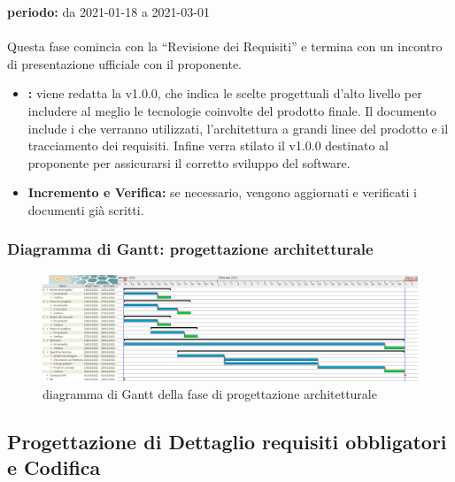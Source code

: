 	\textbf{periodo:} da 2021-01-18 a 2021-03-01 
	\\
	\\
	Questa fase comincia con la “Revisione dei Requisiti” e termina con un incontro di presentazione ufficiale con il proponente.
	\begin{itemize}
		\item \textbf{:} viene redatta la  v1.0.0, che indica le scelte progettuali d’alto livello per includere al meglio le tecnologie coinvolte del prodotto finale. Il documento include i  che verranno utilizzati, l’architettura a grandi linee del prodotto e il tracciamento dei requisiti. Infine verra stilato il  v1.0.0 destinato al proponente per assicurarsi il corretto sviluppo del software.
		\item \textbf{Incremento e Verifica:} se necessario, vengono aggiornati e verificati i documenti già scritti.
	\end{itemize}  

	\subsubsection{Diagramma di Gantt: progettazione architetturale}

		\begin{figure}[H]
			\centering
			\includegraphics[width=1\linewidth]{./res/images/Architetturale.png}
			\caption{diagramma di Gantt della fase di progettazione architetturale}
			\label{fig:diagramma di Gantt della fase di progettazione architetturale}
		\end{figure}
	
	
\subsection{Progettazione di Dettaglio requisiti obbligatori e Codifica}

